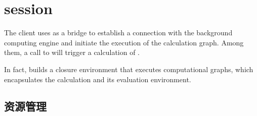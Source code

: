 \begin{savequote}[45mm]
\end{savequote}

\chapter{session} 
\label{ch:session}

\begin{content}

The client uses  as a bridge to establish a connection with the background computing engine and initiate the execution of the calculation graph. Among them, a call to  will trigger a calculation of .

In fact,  builds a closure environment that executes computational graphs, which encapsulates the  calculation and its  evaluation environment.

\end{content}

\section{资源管理}

